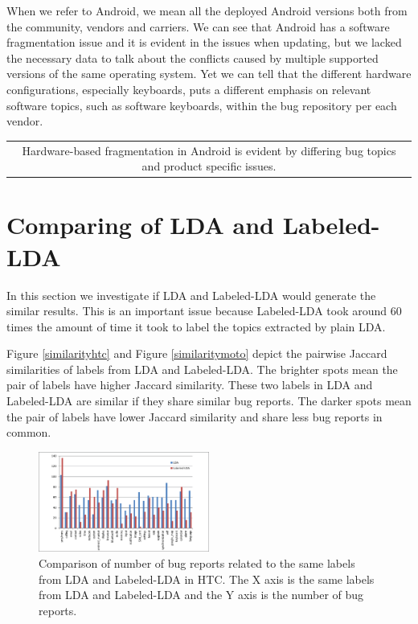 \documentclass[10pt, conference, compsocconf]{IEEEtran}
\begin{document}
When we refer to Android, we mean all the deployed Android versions
both from the community, vendors and carriers. We can see that Android
has a software fragmentation issue and it is evident in the issues
when updating, but we lacked the necessary data to talk about the
conflicts caused by multiple supported versions of the same operating
system. Yet we can tell that the different hardware configurations,
especially keyboards, puts a different emphasis on relevant software
topics, such as software keyboards, within the bug repository per each
vendor.

\vspace*{0.5em}
\begin{tabular}{|c|}
\hline 
\parbox{3.0in}{\centering Hardware-based fragmentation in Android is
  evident by differing bug topics and product specific
  issues.}
\\
\hline
\end{tabular}


\section{Comparing of LDA and Labeled-LDA}
\label{sec:comparinglda}

In this section we investigate if LDA and Labeled-LDA would generate
the similar results. This is an important issue because Labeled-LDA
took around 60 times the amount of time it took to label the topics
extracted by plain LDA.

Figure \ref{similarityhtc} and Figure \ref{similaritymoto} depict the
pairwise Jaccard similarities of labels from LDA and Labeled-LDA. The
brighter spots mean the pair of labels have higher Jaccard
similarity. These two labels in LDA and Labeled-LDA are similar if
they share similar bug reports. The darker spots mean the pair of
labels have lower Jaccard similarity and share less bug reports in
common. 


\begin{figure}
\centering
\includegraphics[width=0.5\textwidth]{htcldallda.eps}
\caption{Comparison of number of bug reports related to the same labels from LDA and Labeled-LDA in HTC. The X axis is the same labels from LDA and Labeled-LDA and the Y axis is the number of bug reports.}
\label{bughtc}
\end{figure}
\end{document}
